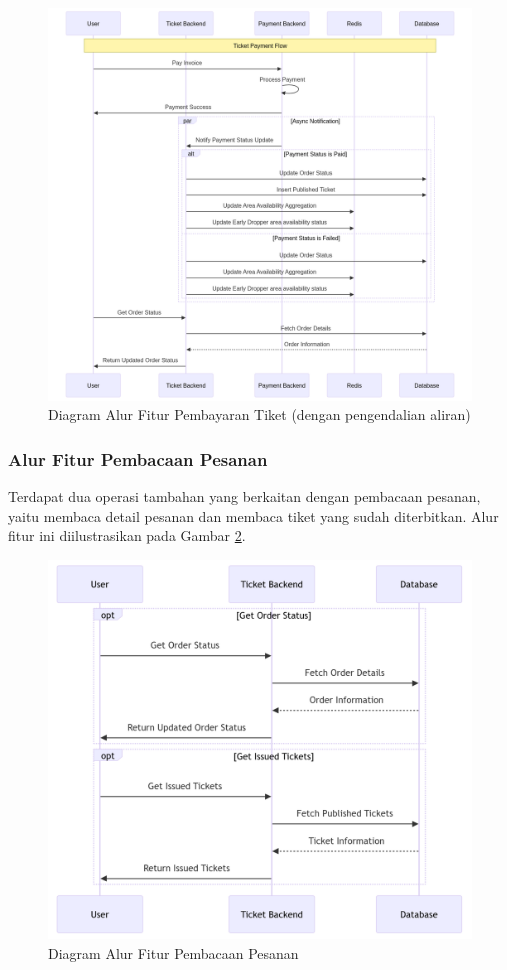\begin{figure}[h]
    \centering
    \includegraphics[width=1\textwidth]{resources/chapter-3/order-payment-fc.png}
    \caption{Diagram Alur Fitur Pembayaran Tiket (dengan pengendalian aliran)}
    \label{fig:flow-order-payment-fc}
\end{figure}

\pagebreak

\subsubsection{Alur Fitur Pembacaan Pesanan}

Terdapat dua operasi tambahan yang berkaitan dengan pembacaan pesanan, yaitu membaca detail pesanan dan membaca tiket yang sudah diterbitkan. Alur fitur ini diilustrasikan pada Gambar \ref{fig:flow-order-flow}.

\begin{figure}[h]
    \centering
    \includegraphics[width=1\textwidth]{resources/chapter-3/order-flow.png}
    \caption{Diagram Alur Fitur Pembacaan Pesanan}
    \label{fig:flow-order-flow}
\end{figure}